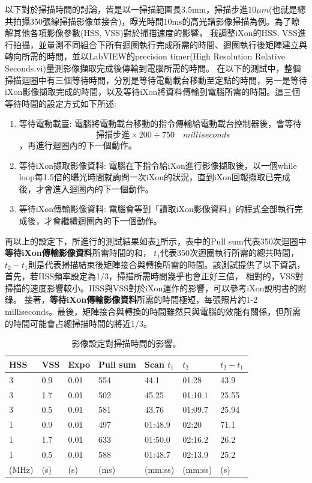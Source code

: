 \documentclass[12pt]{article}
\begin{document}
    以下對於掃描時間的討論，皆是以一掃描範圍長3.5mm，掃描步進$10\mu m$(也就是總共拍攝350張線掃描影像並接合)，曝光時間10ms的高光譜影像掃描為例。為了瞭解其他各項影像參數(HSS, VSS)對於掃描速度的影響，
    我調整iXon的HSS, VSS進行拍攝，並量測不同組合下所有迴圈執行完成所需的時間、迴圈執行後矩陣建立與轉向所需的時間，並以LabVIEW的precision timer(High Resolution Relative Seconds.vi)量測影像擷取完成後傳輸到電腦所需的時間。
    在以下的測試中，整個掃描迴圈中有三個等待時間，分別是等待電動載台移動至定點的時間，另一是等待iXon影像擷取完成的時間，以及等待iXon將資料傳輸到電腦所需的時間。這三個等待時間的設定方式如下所述:
    \begin{enumerate}
        \item 等待電動載臺: 電腦將電動載台移動的指令傳輸給電動載台控制器後，會等待\begin{equation} \label{eq: stageWait}
            \text{掃描步進}\times 200 \div 750 \quad milliseconds
        \end{equation}，再進行迴圈內的下一個動作。
        \item 等待iXon擷取影像資料: 電腦在下指令給iXon進行影像擷取後，以一個while loop每1.5倍的曝光時間就詢問一次iXon的狀況，直到iXon回報擷取已完成後，才會進入迴圈內的下一個動作。
        \item 等待iXon傳輸影像資料: 電腦會等到「讀取iXon影像資料」的程式全部執行完成後，才會繼續迴圈內的下一個動作。
    \end{enumerate}
    再以上的設定下，所進行的測試結果如表\ref{tab: measuring}所示，表中的Pull sum代表350次迴圈中\textbf{等待iXon傳輸影像資料}所需時間的和，
    $t_1$代表350次迴圈執行所需的總共時間，$t_2-t_1$則是代表掃描結束後矩陣接合與轉換所需的時間。該測試提供了以下資訊，首先，若HSS頻率設定為1/3，掃描所需時間幾乎也會正好三倍，
    相對的，VSS對掃描的速度影響較小。HSS與VSS對於iXon運作的影響，可以參考iXon說明書的附錄。\cite{ixonManual}
    接著，\textbf{等待iXon傳輸影像資料}所需的時間極短，每張照片約1-2 milliseconds。最後，矩陣接合與轉換的時間雖然只與電腦的效能有關係，但所需的時間可能會占總掃描時間的將近1/3。
    \begin{table}[]
        \centering
        \begin{tabular}{lll||llll}
        HSS & VSS & Expo & Pull sum & Scan $t_1$  & $t_2$      & $t_2-t_1$  \\ \hline \hline
        3   & 0.9 & 0.01 & 554       & 44.1    & 01:28   & 43.9  \\ \hline
        3   & 1.7 & 0.01 & 502       & 45.25   & 01:10.1 & 25.55 \\ \hline
        3   & 0.5 & 0.01 & 581       & 43.76   & 01:09.7 & 25.94 \\ \hline
        1   & 0.9 & 0.01 & 497       & 01:48.9 & 02:20   & 71.1  \\ \hline
        1   & 1.7 & 0.01 & 633       & 01:50.0 & 02:16.2 & 26.2  \\ \hline
        1   & 0.5 & 0.01 & 588       & 01:48.7 & 02:13.9 & 25.2  \\
        (MHz)&(s)     &(s)    & (ms)         & (mm:ss)       & (mm:ss)       & (s)   
        \end{tabular}
        \label{tab: measuring}
        \caption{影像設定對掃描時間的影響。}
    \end{table}
\end{document}
